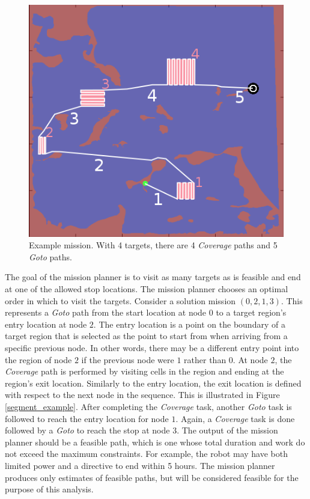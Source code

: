 \documentclass{tamuccthesis}
\begin{document}
\begin{figure}[H]
\includegraphics[]{nummissions.png}
\caption[Example mission.]{Example mission. With 4 targets, there are 4 \textit{Coverage} paths and 5 \textit{Goto} paths.}
\label{fig:missionplanning}
\end{figure}

The goal of the mission planner is to visit as many targets as is feasible and end at one of the allowed stop locations.  The mission planner chooses an optimal order in which to visit the targets. Consider a solution mission $(0, 2, 1, 3)$. This represents a \textit{Goto} path from the start location at node 0 to a target region's entry location at node $2$. The entry location is a point on the boundary of a target region that is selected as the point to start from when arriving from a specific previous node. In other words, there may be a different entry point into the region of node $2$ if the previous node were $1$ rather than $0$. At node $2$, the \textit{Coverage} path is performed by visiting cells in the region and ending at the region's exit location. Similarly to the entry location, the exit location is defined with respect to the next node in the sequence. This is illustrated in Figure \ref{segment_example}. After completing the \textit{Coverage} task, another \textit{Goto} task is followed to reach the entry location for node $1$. Again, a \textit{Coverage} task is done followed by a \textit{Goto} to reach the stop at node $3$. The output of the mission planner should be a feasible path, which is one whose total duration and work do not exceed the maximum constraints. For example, the robot may have both limited power and a directive to end within 5 hours. The mission planner produces only estimates of feasible paths, but will be considered feasible for the purpose of this analysis. 
\end{document}
